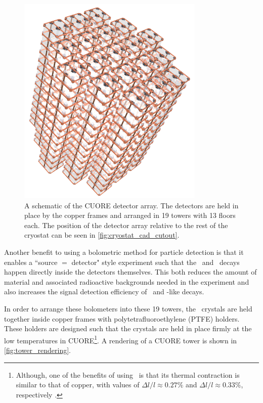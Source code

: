 \begin{figure}
    \centering
    \includegraphics[height=4in]{Figures/CUORE_detector_array_0.png}
    \caption[A schematic of the CUORE detector array.]
    {A schematic of the CUORE detector array.
    The detectors are held in place by the copper frames and arranged in 19 towers with 13 floors each.
    The position of the detector array relative to the rest of the cryostat can be seen in \autoref{fig:cryostat_cad_cutout}.}
    \label{fig:cuore_detector_array}
\end{figure}

Another benefit to using a bolometric method for particle detection is that it enables a ``source $=$ detector" style experiment such that the \zeronubb~and \twonubb~decays happen directly inside the detectors themselves.
This both reduces the amount of material and associated radioactive backgrounds needed in the experiment and also increases the signal detection efficiency of \zeronubb~and \twonubb-like decays.

In order to arrange these bolometers into these 19 towers, the \teotwo~crystals are held together inside copper frames with polytetrafluoroethylene (PTFE) holders.
These holders are designed such that the crystals are held in place firmly at the low temperatures in CUORE\footnote{Although, one of the benefits of using \teotwo~is that its thermal contraction is similar to that of copper, with values of $\Delta l/l \approx 0.27\%$ and $\Delta l / l \approx 0.33\%$, respectively \cite{ALESSANDRELLO1995363}.}.
A rendering of a CUORE tower is shown in \autoref{fig:tower_rendering}.


